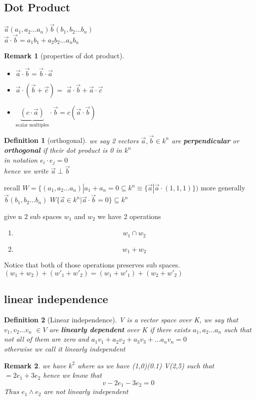 \documentclass{article}
\newtheorem*{definition}{Definition}
\newtheorem*{remark}{Remark}
\newcommand{\cd}{\cdot}
\newcommand{\as}{a_1,a_2\dots a_n}
\newcommand{\bs}{b_1,b_2\dots b_n}
\newcommand{\vs}{v_1,v_2\dots v_n}
\newcommand{\veca}{\Vec{a}}
\newcommand{\vecb}{\Vec{b}}
\newcommand{\vecc}{\Vec{c}}
\begin{document}
\subsection{Dot Product}
$\Vec{a} (\as) \Vec{b}(\bs)$
\\$\Vec{a}\cd\Vec{b}=a_1b_1+a_2b_2\dots a_nb_n$\\
\begin{remark}[properties of dot product] \phantom\\
\begin{itemize}
    \item $\Vec{a}\cd\Vec{b}=\Vec{b}\cd\Vec{a}$
    \item $\Vec{a}\cd(\Vec{b}+\Vec{c})=$ $\veca \cd \vecb+\veca \cd \vecc$
    \item $\underbrace{(c\cd \veca)}_{\text{scalar multiples}}\cd\vecb=c(\veca\cd \vecb)$

    \end{itemize}

\end{remark}

\begin{definition}[orthogonal]
we say 2 vectors $\veca , \vecb \in k^n$ are \textbf{perpendicular } or \textbf{orthogonal} if their dot product is 0 in $k^n$
\\ in notation $e_i \cd e_j=0$\\
hence we write $\veca \perp \vecb$\\
    
\end{definition}
recall $W=\{(\as )|a_1+a_n=0 \subseteq k^n \equiv \{\veca |\veca \cd (1,1,1)\})$
more generally $\vecb (\bs)$
$W\{\veca \in k^n | \veca \cd \vecb =0\} \subseteq k^n$


give n 2 sub spaces $w_1$ and $w_2$ we have 2 operations 
\begin{enumerate}
    \item $$w_1\cap w_2$$
    \item $$w_1+w_2$$

\end{enumerate}
Notice that both of those operations preserves sub spaces. \\
$(w_1+w_2)+(w'_1+w'_2)=(w_1+w'_1)+(w_2+w'_2)$
\subsection{linear independence}
\begin{definition}
    [Linear independence] V is a vector space over K, we say that $\vs$ $\in V$ are \textbf{linearly dependent }over K if there exists $\as$ such that not all of them are zero and $a_1v_1+a_2v_2+a_3v_3+\dots a_nv_n=0$\\
    otherwise we call it linearly independent\\
\end{definition}
\begin{remark}
    we have $k^2$ where as we have (1,0)(0.1) V(2,5) such that $=2e_1+3e_2$ hence we know that 
    $$v-2e_1-3e_2=0$$ Thus $e_1 \land e_2$ are not linearly independent\\

    
\end{remark}
\end{document}
